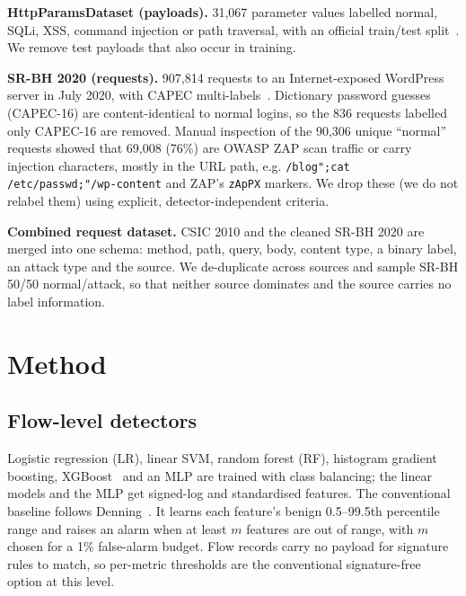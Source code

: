 \documentclass[conference]{IEEEtran}
\begin{document}
\textbf{HttpParamsDataset (payloads).} 31,067 parameter values labelled normal, SQLi, XSS,
command injection or path traversal, with an official train/test split~\cite{httpparams}. We remove
test payloads that also occur in training.

\textbf{SR-BH 2020 (requests).} 907,814 requests to an Internet-exposed WordPress server in July
2020, with CAPEC multi-labels~\cite{srbh2022}. Dictionary password guesses (CAPEC-16) are
content-identical to normal logins, so the 836 requests labelled only CAPEC-16 are removed. Manual
inspection of the 90,306 unique ``normal'' requests showed that 69,008 (76\%) are OWASP ZAP
scan traffic or carry injection characters, mostly in the URL path, e.g.
\texttt{/blog";cat /etc/passwd;"/wp-content} and ZAP's \texttt{zApPX} markers. We drop these
(we do not relabel them) using explicit, detector-independent criteria.

\textbf{Combined request dataset.} CSIC 2010 and the cleaned SR-BH 2020 are merged into one schema:
method, path, query, body, content type, a binary label, an attack type and the source. We
de-duplicate across sources and sample SR-BH 50/50 normal/attack, so that neither source dominates
and the source carries no label information.

\section{Method}
\subsection{Flow-level detectors}
Logistic regression (LR), linear SVM, random forest (RF), histogram gradient boosting, XGBoost~\cite{xgboost}
and an MLP are trained with class balancing; the linear models and the MLP get signed-log and standardised
features. The conventional baseline follows Denning~\cite{denning1987}. It learns each feature's benign
0.5--99.5th percentile range and raises an alarm when at least $m$ features are out of range, with $m$
chosen for a 1\% false-alarm budget. Flow records carry no payload for signature rules to
match, so per-metric thresholds are the conventional signature-free option at this level.
\end{document}
